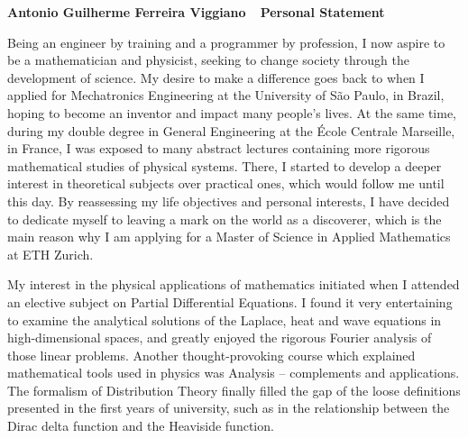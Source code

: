 \documentclass[11pt]{article}
\def\firstname{Antonio Guilherme }
\def\familyname{Ferreira Viggiano}
\def\subj{Personal Statement}
\def\FileTitle{\firstname\familyname~\textemdash~\subj}
\begin{document}
\sffamily %

{\bfseries \FileTitle}



Being an engineer by training and a programmer by profession, I now aspire to be a mathematician and physicist, seeking to change society through the development of science. My desire to make a difference goes back to when I applied for Mechatronics Engineering at the University of São Paulo, in Brazil, hoping to become an inventor and impact many people's lives. At the same time, during my double degree in General Engineering at the École Centrale Marseille, in France, I was exposed to many abstract lectures containing more rigorous mathematical studies of physical systems. There, I started to develop a deeper interest in theoretical subjects over practical ones, which would follow me until this day. By reassessing my life objectives and personal interests, I have decided to dedicate myself to leaving a mark on the world as a discoverer, which is the main reason why I am applying for a Master of Science in Applied Mathematics at ETH Zurich.

My interest in the physical applications of mathematics initiated when I attended an elective subject on Partial Differential Equations. I found it very entertaining to examine the analytical solutions of the Laplace, heat and wave equations in high-dimensional spaces, and greatly enjoyed the rigorous Fourier analysis of those linear problems. Another thought-provoking course which explained mathematical tools used in physics was Analysis -- complements and applications. The formalism of Distribution Theory finally filled the gap of the loose definitions presented in the first years of university, such as in the relationship between the Dirac delta function and the Heaviside function.
\end{document}

